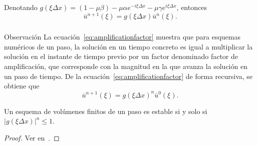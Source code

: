 \begin{frame}
    Denotando
    \begin{math}
        g
        \left(\xi\Delta x\right)=
        \left(1-\mu\beta\right)-
        \mu\alpha
        e^{-i\xi\Delta x}-
        \mu\gamma
        e^{i\xi\Delta x}
    \end{math},
    entonces
    \begin{equation}\label{eq:amplificationfactor}
        \overline{u}^{n+1}
        \left(\xi\right)=
        g
        \left(\xi\Delta x\right)
        \overline{u}^{n}
        \left(\xi\right).
    \end{equation}
\end{frame}

\begin{frame}
    \frametitle{\secname}

    \begin{alertblock}{Observación}
        La ecuación~\eqref{eq:amplificationfactor} muestra que para esquemas
        numéricos de un paso, la solución en un tiempo concreto es igual a
        multiplicar la solución en el instante de tiempo previo por un factor
        denominado factor de amplificación, que corresponde con la magnitud
        en la que avanza la solución en un paso de tiempo.
        De la ecuación~\eqref{eq:amplificationfactor} de forma recursiva, se
        obtiene que
        \begin{equation*}
            \overline{u}^{n+1}
            \left(\xi\right)=
            {g\left(\xi\Delta x\right)}^{n}
            \overline{u}^{0}
            \left(\xi\right).
        \end{equation*}
    \end{alertblock}

    \begin{theorem}\normalfont
        Un esquema de volúmenes finitos de un paso es estable si y solo si
        \begin{math}
            {\left|
            {g\left(\xi\Delta x\right)}
            \right|}^{n}\leq
            1
        \end{math}.
    \end{theorem}

    \begin{proof}
        Ver en~\cite{Strikwerda2004}.
    \end{proof}
\end{frame}


